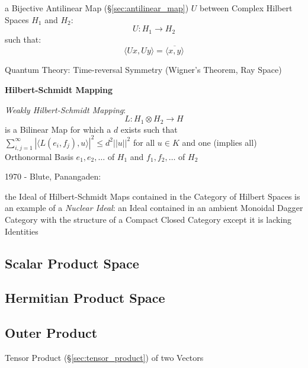 a Bijective Antilinear Map (\S\ref{sec:antilinear_map}) $U$ between Complex
Hilbert Spaces $H_1$ and $H_2$:
\[
  U : H_1 \rightarrow H_2
\]
such that:
\[
  \langle{Ux,Uy}\rangle = \overline{\langle{x,y}\rangle}
\]

Quantum Theory: Time-reversal Symmetry (Wigner's Theorem, Ray Space) %



\textbf{Hilbert-Schmidt Mapping}

\emph{Weakly Hilbert-Schmidt Mapping}:
\[
  L : H_1 \otimes H_2 \rightarrow H
\]
is a Bilinear Map for which a $d$ exists such that
$\sum_{i,j=1}^\infty | \langle L(e_i,f_j), u \rangle |^2 \leq d^2
||u||^2$ for all $u \in K$ and one (implies all) Orthonormal Basis
$e_1, e_2, \ldots$ of $H_1$ and $f_1, f_2, \ldots$ of $H_2$


1970 - Blute, Panangaden:

the Ideal of Hilbert-Schmidt Maps contained in the Category of Hilbert
Spaces is an example of a \emph{Nuclear Ideal}: an Ideal contained in
an ambient Monoidal Dagger Category with the structure of a Compact
Closed Category except it is lacking Identities



\subsection{Scalar Product Space}\label{sec:scalar_product_space}

\subsection{Hermitian Product Space}\label{sec:hermitian_product_space}

\subsection{Outer Product}\label{sec:outer_product}

Tensor Product (\S\ref{sec:tensor_product}) of two Vectors

